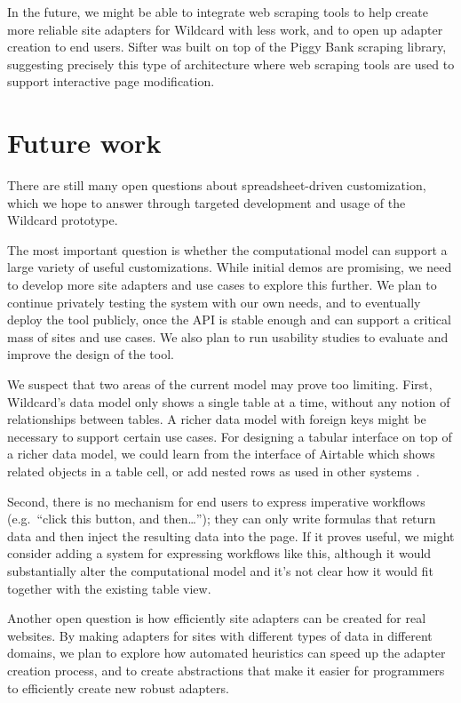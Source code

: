 \documentclass[english,submission]{programming}
\begin{document}
In the future, we might be able to integrate web scraping tools to help
create more reliable site adapters for Wildcard with less work, and to
open up adapter creation to end users. Sifter was built on top of the
Piggy Bank scraping library, suggesting precisely this type of
architecture where web scraping tools are used to support interactive
page modification.

\hypertarget{future-work}{%
\section{Future work}\label{future-work}}

There are still many open questions about spreadsheet-driven
customization, which we hope to answer through targeted development and
usage of the Wildcard prototype.

The most important question is whether the computational model can
support a large variety of useful customizations. While initial demos
are promising, we need to develop more site adapters and use cases to
explore this further. We plan to continue privately testing the system
with our own needs, and to eventually deploy the tool publicly, once the
API is stable enough and can support a critical mass of sites and use
cases. We also plan to run usability studies to evaluate and improve the
design of the tool.

We suspect that two areas of the current model may prove too limiting.
First, Wildcard's data model only shows a single table at a time,
without any notion of relationships between tables. A richer data model
with foreign keys might be necessary to support certain use cases. For
designing a tabular interface on top of a richer data model, we could
learn from the interface of Airtable which shows related objects in a
table cell, or add nested rows as used in other systems
\autocite{mccutchen2016,bakke2016}.

Second, there is no mechanism for end users to express imperative
workflows (e.g.~``click this button, and then\ldots{}''); they can only
write formulas that return data and then inject the resulting data into
the page. If it proves useful, we might consider adding a system for
expressing workflows like this, although it would substantially alter
the computational model and it's not clear how it would fit together
with the existing table view.

Another open question is how efficiently site adapters can be created
for real websites. By making adapters for sites with different types of
data in different domains, we plan to explore how automated heuristics
can speed up the adapter creation process, and to create abstractions
that make it easier for programmers to efficiently create new robust
adapters.
\end{document}

